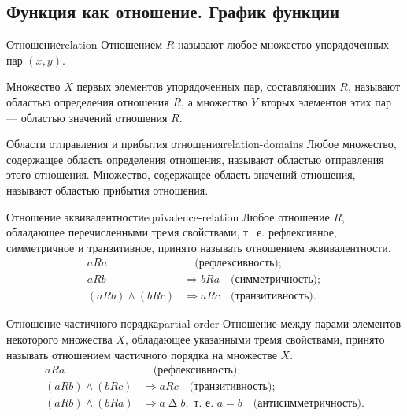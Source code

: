 \subsection{Функция как отношение. График функции}

\begin{definition}{Отношение}{relation}
  Отношением $R$ называют любое множество упорядоченных пар $(x,y)$.

  Множество $X$ первых элементов упорядоченных пар, составляющих $R$,
  называют областью определения отношения $R$, а множество $Y$ вторых
  элементов этих пар — областью значений отношения $R$.
\end{definition}

\begin{definition}{Области отправления и прибытия отношения}{relation-domains}
  Любое множество, содержащее область определения отношения, называют
  областью отправления этого отношения. Множество, содержащее область
  значений отношения, называют областью прибытия отношения.
\end{definition}

\begin{definition}{Отношение эквивалентности}{equivalence-relation}
  Любое отношение $R$, обладающее перечисленными тремя свойствами, т.~е.
  рефлексивное, симметричное и транзитивное, принято называть отношением
  эквивалентности.
  \begin{align*}
    aRa &\quad\text{(рефлексивность)};\\
    aRb&\Rightarrow bRa \quad\text{(симметричность)};\\
    (aRb)\land(bRc)&\Rightarrow aRc \quad\text{(транзитивность)}.
  \end{align*}
\end{definition}

\begin{definition}{Отношение частичного порядка}{partial-order}
  Отношение между парами элементов некоторого множества $X$, обладающее
  указанными тремя свойствами, принято называть отношением частичного
  порядка на множестве $X$.
  \begin{align*}
    aRa &\quad\text{(рефлексивность)};\\
    (aRb)\land(bRc)&\Rightarrow aRc \quad\text{(транзитивность)};\\
    (aRb)\land(bRa)&\Rightarrow a\mathbin{\Delta}b,
      \text{ т.~е. }a=b \quad\text{(антисимметричность)}.
  \end{align*}
\end{definition}

